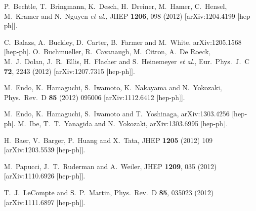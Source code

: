\begin{thebibliography}{99}
  P.~Bechtle, T.~Bringmann, K.~Desch, H.~Dreiner, M.~Hamer, C.~Hensel, M.~Kramer and N.~Nguyen {\it et al.},
  JHEP {\bf 1206}, 098 (2012)
  [arXiv:1204.4199 [hep-ph]].

  C.~Balazs, A.~Buckley, D.~Carter, B.~Farmer and M.~White,
  arXiv:1205.1568 [hep-ph].
  O.~Buchmueller, R.~Cavanaugh, M.~Citron, A.~De Roeck, M.~J.~Dolan, J.~R.~Ellis, H.~Flacher and S.~Heinemeyer {\it et al.},
  Eur.\ Phys.\ J.\ C {\bf 72}, 2243 (2012)
  [arXiv:1207.7315 [hep-ph]].


  M.~Endo, K.~Hamaguchi, S.~Iwamoto, K.~Nakayama and N.~Yokozaki,
  Phys.\ Rev.\ D {\bf 85} (2012) 095006
  [arXiv:1112.6412 [hep-ph]].

  M.~Endo, K.~Hamaguchi, S.~Iwamoto and T.~Yoshinaga,
  arXiv:1303.4256 [hep-ph].
  M.~Ibe, T.~T.~Yanagida and N.~Yokozaki,
  arXiv:1303.6995 [hep-ph].


  H.~Baer, V.~Barger, P.~Huang and X.~Tata,
  JHEP {\bf 1205} (2012) 109
  [arXiv:1203.5539 [hep-ph]].

  M.~Papucci, J.~T.~Ruderman and A.~Weiler,
  JHEP {\bf 1209}, 035 (2012)
  [arXiv:1110.6926 [hep-ph]].

  T.~J.~LeCompte and S.~P.~Martin,
  Phys.\ Rev.\ D {\bf 85}, 035023 (2012)
  [arXiv:1111.6897 [hep-ph]].


\end{thebibliography}

